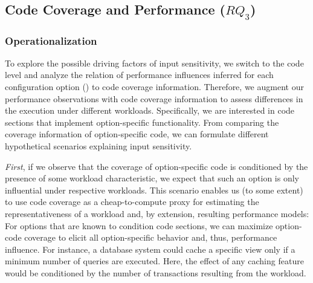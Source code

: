 {{
\subsection{Code Coverage and Performance ($RQ_3$)}\label{sec:rq3}\label{sec:categories}
\subsubsection{Operationalization}To explore the possible driving factors of input sensitivity, we switch to the code level and analyze the relation of performance influences inferred for each configuration option () to code coverage information. Therefore, we augment our performance observations with code coverage information to assess differences in the execution under different workloads. Specifically, we are interested in code sections that implement option-specific functionality. From comparing the coverage information of option-specific code, we can formulate different hypothetical scenarios explaining input sensitivity. 

\textit{First}, if we observe that the  coverage of option-specific code is conditioned by the presence of some workload characteristic, we expect that such an option is only influential under respective workloads. This scenario enables us (to some extent) to use code coverage as a cheap-to-compute proxy for estimating the representativeness of a workload and, by extension, resulting performance models: For options that are known to condition code sections, we can maximize option-code coverage to elicit all option-specific behavior and, thus, performance influence. For instance, a database system could cache a specific view only if a minimum number of queries are executed. Here, the effect of any caching feature would be conditioned by the number of transactions resulting from the workload.

}}

